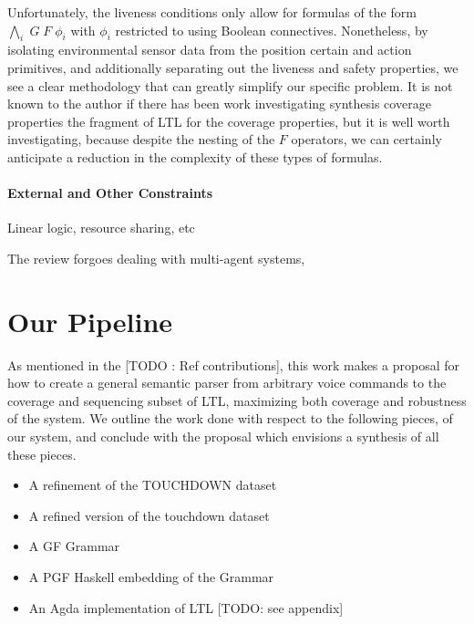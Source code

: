\documentclass[a4paper, 11pt]{article}
\begin{document}
Unfortunately, the liveness conditions only allow for formulas of the form
$\underset{i}{\bigwedge}\;G\; F\; \phi_i$ with $\phi_i$ restricted to using
Boolean connectives. Nonetheless, by isolating environmental sensor data from
the position certain and action primitives, and additionally separating out the liveness
and safety properties, we see a clear methodology that can greatly simplify our
specific problem. It is not known to the author if there has been work
investigating synthesis coverage properties the fragment of LTL for the coverage
properties, but it is well worth investigating, because despite the nesting of
the $F$ operators, we can certainly anticipate a reduction in the complexity of
these types of formulas.




\paragraph{External and Other Constraints}

Linear logic, resource sharing, etc

The review \cite{synthGazit} forgoes dealing with multi-agent systems, 

\section{Our Pipeline}

As mentioned in the [TODO : Ref contributions], this work makes a proposal for
how to create a general semantic parser from arbitrary voice commands to the
coverage and sequencing subset of LTL, maximizing both coverage and robustness
of the system. We outline the work done with respect to the following pieces, of
our system, and conclude with the proposal which envisions a synthesis of all
these pieces.

\begin{itemize}[noitemsep]
\item A refinement of the TOUCHDOWN dataset \cite{chen2019touchdown}
\item A refined version of the touchdown dataset
\item A GF Grammar
\item A PGF Haskell embedding of the Grammar
\item An Agda implementation of LTL [TODO: see appendix]
\end{itemize}
\end{document}
